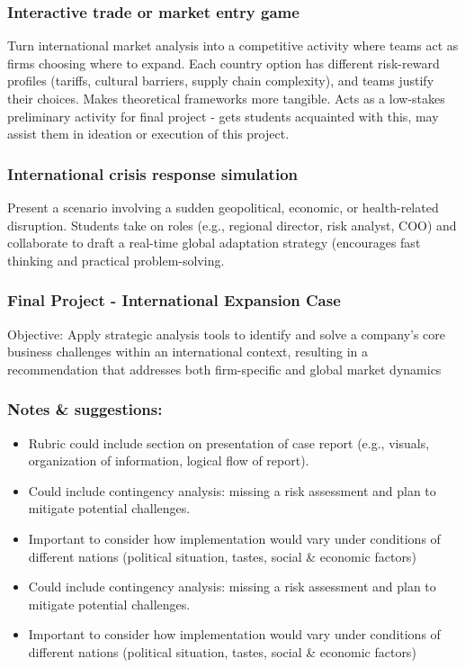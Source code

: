 \documentclass[
  11pt,
]{article}
\providecommand{\tightlist}{%
  \setlength{\itemsep}{0pt}\setlength{\parskip}{0pt}}
\begin{document}
\subsubsection{Interactive trade or market entry
game}\label{interactive-trade-or-market-entry-game}

Turn international market analysis into a competitive activity where
teams act as firms choosing where to expand. Each country option has
different risk-reward profiles (tariffs, cultural barriers, supply chain
complexity), and teams justify their choices. Makes theoretical
frameworks more tangible. Acts as a low-stakes preliminary activity for
final project - gets students acquainted with this, may assist them in
ideation or execution of this project.

\subsubsection{International crisis response
simulation}\label{international-crisis-response-simulation}

Present a scenario involving a sudden geopolitical, economic, or
health-related disruption. Students take on roles (e.g., regional
director, risk analyst, COO) and collaborate to draft a real-time global
adaptation strategy (encourages fast thinking and practical
problem-solving.

\subsubsection{Final Project - International Expansion
Case}\label{final-project---international-expansion-case}

Objective: Apply strategic analysis tools to identify and solve a
company's core business challenges within an international context,
resulting in a recommendation that addresses both firm-specific and
global market dynamics

\subsubsection{Notes \& suggestions:}\label{notes-suggestions}

\begin{itemize}
\tightlist
\item
  Rubric could include section on presentation of case report (e.g.,
  visuals, organization of information, logical flow of report).
\item
  Could include contingency analysis: missing a risk assessment and plan
  to mitigate potential challenges.
\item
  Important to consider how implementation would vary under conditions
  of different nations (political situation, tastes, social \& economic
  factors)
\item
  Could include contingency analysis: missing a risk assessment and plan
  to mitigate potential challenges.
\item
  Important to consider how implementation would vary under conditions
  of different nations (political situation, tastes, social \& economic
  factors)
\end{itemize}
\end{document}
